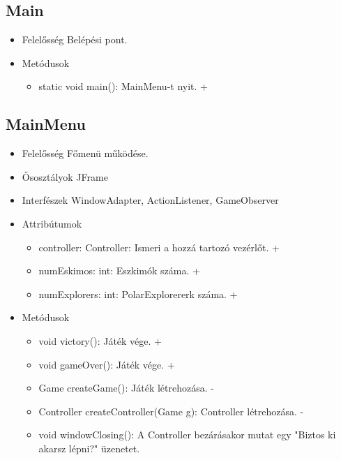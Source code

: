 \subsection{Main}
\begin{itemize}
	\item Felelősség\newline
	Belépési pont.
	\item Metódusok\newline
	\begin{itemize}
		\item static void main(): MainMenu-t nyit. +
	\end{itemize}
\end{itemize}

\subsection{MainMenu}
\begin{itemize}
	\item Felelősség\newline
	Főmenü működése.
	\item Ősosztályok\newline
	JFrame
	\item Interfészek\newline
	WindowAdapter, ActionListener, GameObserver
	\item Attribútumok\newline
	\begin{itemize}
		\item controller: Controller: Ismeri a hozzá tartozó vezérlőt. +	
		\item numEskimos: int: Eszkimók száma. +
		\item numExplorers: int: PolarExplorererk száma. +	
	\end{itemize}
	\item Metódusok\newline
	\begin{itemize}
		\item void victory(): Játék vége. +
		\item void gameOver(): Játék vége. +
		\item Game createGame(): Játék létrehozása. -
		\item Controller createController(Game g): Controller létrehozása. -
		\item void windowClosing(): A Controller bezárásakor mutat egy "Biztos ki akarsz lépni?" üzenetet.
	\end{itemize}
\end{itemize}

